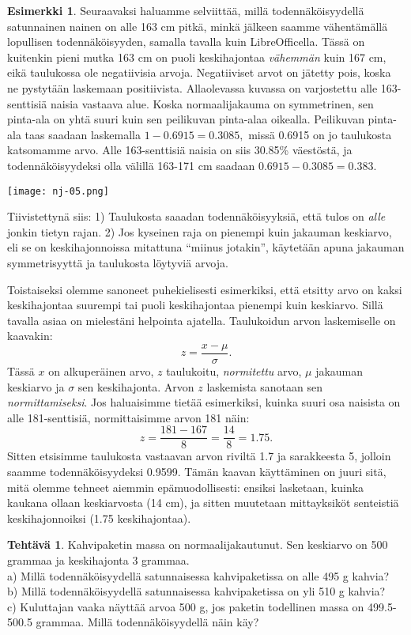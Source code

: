 \documentclass[12pt,leqno,a4paper,oneside]{amsart}
\theoremstyle{definition}
\newtheorem{example}[proclaim]{Esimerkki}
\newtheorem{exercise}{Tehtävä}
\theoremstyle{remark}
\numberwithin{equation}{section}
\begin{document}
\begin{example}
 Seuraavaksi haluamme selviittää, millä todennäköisyydellä satunnainen nainen on alle 163 cm pitkä, minkä jälkeen saamme vähentämällä lo\-pul\-li\-sen
 todennäköisyyden, samalla tavalla kuin LibreOfficella. Tässä on kuitenkin pieni mutka 163 cm on puoli keskihajontaa \emph{vähemmän} kuin 167 cm, 
 eikä taulukossa ole negatiivisia arvoja. Negatiiviset arvot on jätetty pois, koska ne pystytään laskemaan positiivista. Allaolevassa kuvassa on
 varjostettu alle 163-senttisiä naisia vastaava alue. Koska normaalijakauma on symmetrinen, sen pinta-ala on yhtä suuri kuin sen peilikuvan pinta-alaa
 oikealla. Peilikuvan pinta-ala taas saadaan laskemalla $1-0.6915 = 0.3085,$ missä 0.6915 on jo taulukosta katsomamme arvo. Alle 163-senttisiä
 naisia on siis 30.85\% väestöstä, ja todennäköisyydeksi olla välillä 163-171 cm saadaan $0.6915-0.3085 = 0.383.$
 
 \begin{center}
  \texttt{[image: nj-05.png]}
 \end{center}

 
 Tiivistettynä siis: 1) Taulukosta saaadan todennäköisyyksiä, että tulos on \emph{alle} jonkin tietyn rajan. 2) Jos kyseinen raja on pienempi kuin
 jakauman keskiarvo, eli se on keskihajonnoissa mitattuna ``miinus jotakin'', käytetään apuna jakauman symmetrisyyttä ja taulukosta löytyviä arvoja.
 
 Toistaiseksi olemme sanoneet puhekielisesti esimerkiksi, että etsitty arvo on kaksi keskihajontaa suurempi tai puoli keskihajontaa pienempi kuin 
 keskiarvo. Sillä tavalla asiaa on mielestäni helpointa ajatella. Taulukoidun arvon laskemiselle on kaavakin:
 $$z=\frac{x-\mu}{\sigma}.$$
 Tässä $x$ on alkuperäinen arvo, $z$ taulukoitu, \emph{normitettu} arvo, $\mu$ jakauman keskiarvo ja $\sigma$ sen keskihajonta. Arvon $z$ laskemista
 sanotaan sen \emph{normittamiseksi}. Jos haluaisimme tietää esimerkiksi, kuinka suuri osa naisista on
 alle 181-senttisiä, normittaisimme arvon 181 näin:
 $$z=\frac{181-167}{8} = \frac{14}{8} =1.75 .$$
 Sitten etsisimme taulukosta vastaavan arvon riviltä 1.7 ja sarakkeesta 5, jolloin saamme todennäköisyydeksi 0.9599. Tämän kaavan käyttäminen on
 juuri sitä, mitä olemme tehneet aiemmin epämuodollisesti: ensiksi lasketaan, kuinka kaukana ollaan keskiarvosta (14 cm), ja sitten muutetaan mittayksiköt 
 senteistiä keskihajonnoiksi (1.75 keskihajontaa).

\end{example}

 
\begin{exercise}
 Kahvipaketin massa on normaalijakautunut. Sen keskiarvo on 500 grammaa ja keskihajonta 3 grammaa.\\
 a) Millä todennäköisyydellä satunnaisessa kahvipaketissa on alle 495 g kahvia?\\
 b) Millä todennäköisyydellä satunnaisessa kahvipaketissa on yli 510 g kahvia?\\
 c) Kuluttajan vaaka näyttää arvoa 500 g, jos paketin todellinen massa on 499.5-500.5 grammaa. Millä todennäköisyydellä näin käy?
\end{exercise}
\end{document}
